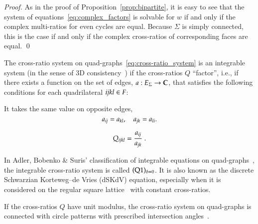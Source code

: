 \documentclass[Thesis]{subfiles}
\begin{document}
\begin{proof}
  As in the proof of Proposition~\ref{prop:bipartite}, it is easy to
  see that the system of equations~\eqref{eq:complex_factors} is
  solvable for $w$ if and only if the complex multi-ratios for even
  cycles are equal. Because $\Sigma$ is simply connected, this is the
  case if and only if the complex cross-ratios of corresponding faces
  are equal.
  \qed
\end{proof}

\begin{remark}
  The cross-ratio system on quad-graphs~\eqref{eq:cross-ratio_system}
  is an integrable system (in the sense of 3D
  consistency~\cite{Bobenko-Suris2002, BobenkoSuris2008}) if the
  cross-ratios $Q$ ``factor'', i.e., if there exists a function on the
  set of edges, $a:E_{\Sigma}\rightarrow\mathbb C$, that satisfies the
  following conditions for each quadrilateral ${\it ijkl}\in F$:
  \begin{compactenum}[(i)]
  \item It takes the same value on opposite edges,
    \begin{equation}
      a_{\it ij}=a_{\it kl}, \quad a_{\it jk}=a_{\it li}.
    \end{equation}
  \item 
    \begin{equation}
      \label{eq:Q_factors}
      Q_{\it ijkl} = \frac{a_{\it ij}}{a_{\it jk}}\ .
    \end{equation}
  \end{compactenum}
  In Adler, Bobenko \& Suris' classification of integrable equations
  on quad-graphs~\cite{Adler-Bobenko-Suris2003}, the integrable
  cross-ratio system is called $({\rm Q1})_{\delta=0}$. It is also
  known as the discrete Schwarzian Korteweg--de Vries (dSKdV)
  equation, especially when it is considered on the regular square
  lattice~\cite{NijhoffCapel1995} with constant cross-ratios. 

  If the cross-ratios $Q$ have unit modulus, the cross-ratio system on
  quad-graphs is connected with circle patterns with prescribed
  intersection angles~\cite{Bobenko-Suris2002, BobenkoSuris2008}.
\end{remark}
\end{document}
